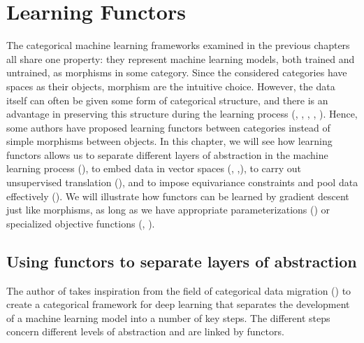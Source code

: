 \documentclass[11pt,a4paper,openright,twoside]{report}
\theoremstyle{plain}
\theoremstyle{definition}
\begin{document}
\chapter{Learning Functors}


\lhead[\fancyplain{}{\bfseries\thepage}]{\fancyplain{}{\bfseries\rightmark}}



The categorical machine learning frameworks examined in the previous chapters all share one property: they represent machine learning models, both trained and untrained, as morphisms in some category. Since the considered categories have spaces as their objects, morphism are the intuitive choice. However, the data itself can often be given some form of categorical structure, and there is an advantage in preserving this structure during the learning process (\cite{gavranovic2019compositional}, \cite{sheshmani2021categorical}, \cite{coecke2010mathematical}, \cite{lewis2019compositionality}, \cite{chytas2024poolingimagedatasetsmultiple}). Hence, some authors have proposed learning functors between categories instead of simple morphisms between objects. In this chapter, we will see how learning functors allows us to separate different layers of abstraction in the machine learning process (\cite{gavranovic2019compositional}), to embed data in vector spaces (\cite{sheshmani2021categorical}, \cite{coecke2010mathematical},\cite{lewis2019compositionality}), to carry out unsupervised translation (\cite{sheshmani2021categorical}), and to impose equivariance constraints and pool data effectively (\cite{chytas2024poolingimagedatasetsmultiple}).
We will illustrate how functors can be learned by gradient descent just like morphisms, as long as we have appropriate parameterizations (\cite{gavranovic2019compositional}) or specialized objective functions (\cite{sheshmani2021categorical}, \cite{chytas2024poolingimagedatasetsmultiple}). 





\section{Using functors to separate layers of abstraction}

The author of \cite{gavranovic2019compositional} takes inspiration from the field of categorical data migration (\cite{spivak2012functorial}) to create a categorical framework for deep learning that separates the development of a machine learning model into a number of key steps. The different steps concern different levels of abstraction and are linked by functors.
\end{document}
